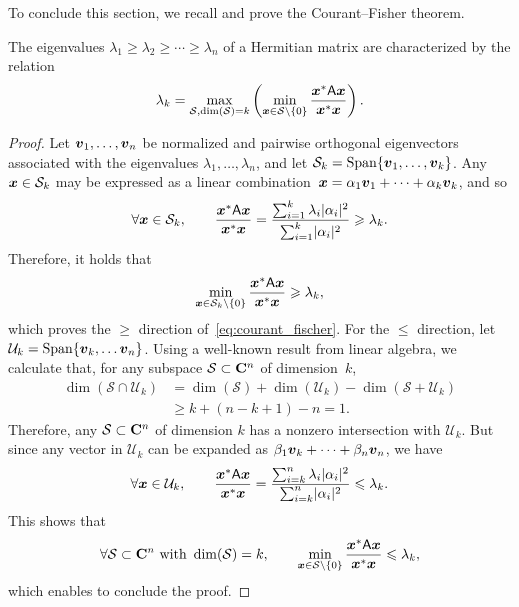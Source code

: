 To conclude this section,
we recall and prove the Courant--Fisher theorem.
\begin{theorem}
    \label{theorem:courant-fisher}
    The eigenvalues $\lambda_1 \geq \lambda_2 \geq \dotsb \geq \lambda_n$ of a Hermitian matrix are characterized by the relation
    \begin{equation}
        \label{eq:courant_fischer}
        \lambda_k = \max_{\mathcal S, {\rm dim}(\mathcal S) = k} \left( \min_{\mathbf{\boldsymbol{x}} \in \mathcal S \backslash\{0\}} \frac{\mathbf{\boldsymbol{x}}^* \mathsf A \mathbf{\boldsymbol{x}}}{\mathbf{\boldsymbol{x}}^* \mathbf{\boldsymbol{x}}} \right).
    \end{equation}
\end{theorem}
\begin{proof}
    Let $\mathbf{\boldsymbol{v}}_1, \dotsc, \mathbf{\boldsymbol{v}}_n$ be normalized and pairwise orthogonal eigenvectors associated with the eigenvalues $\lambda_1, \dotsc, \lambda_n$,
    and let $\mathcal S_k = \operatorname{Span} \{ \mathbf{\boldsymbol{v}}_1, \dotsc, \mathbf{\boldsymbol{v}}_k \}$.
    Any $\mathbf{\boldsymbol{x}} \in \mathcal S_k$ may be expressed as a linear combination~$\mathbf{\boldsymbol{x}} = \alpha_1 \mathbf{\boldsymbol{v}}_1 + \dotsb + \alpha_k \mathbf{\boldsymbol{v}}_k$,
    and so
    \[
        \forall \mathbf{\boldsymbol{x}} \in \mathcal S_k, \qquad
        \frac{\mathbf{\boldsymbol{x}}^* \mathsf A \mathbf{\boldsymbol{x}}}{\mathbf{\boldsymbol{x}}^* \mathbf{\boldsymbol{x}}} =
        \frac{\sum_{i=1}^{k} \lambda_i \lvert\alpha_i\rvert^2}{\sum_{i=1}^{k} \lvert\alpha_i\rvert^2}
        \geqslant \lambda_k.
    \]
    Therefore,
    it holds that
    \[
         \min_{\mathbf{\boldsymbol{x}} \in \mathcal S_k \backslash\{0\}} \frac{\mathbf{\boldsymbol{x}}^* \mathsf A \mathbf{\boldsymbol{x}}}{\mathbf{\boldsymbol{x}}^* \mathbf{\boldsymbol{x}}}  \geqslant \lambda_k,
    \]
    which proves the $\geq$ direction of~\eqref{eq:courant_fischer}.
    For the $\leq$ direction,
    let $\mathcal U_k = \operatorname{Span} \{ \mathbf{\boldsymbol{v}}_{k}, \dots \mathbf{\boldsymbol{v}}_n \}$.
    Using a well-known result from linear algebra,
    we calculate that, for any subspace $\mathcal S \subset \mathbf C^n$ of dimension~$k$,
    \begin{align*}
        \dim(\mathcal S \cap \mathcal U_k)
        &= \dim(\mathcal S) + \dim(\mathcal U_k) -\dim(\mathcal S + \mathcal U_k) \\
        &\geq  k + (n - k + 1) - n = 1.
    \end{align*}
    Therefore, any $\mathcal S \subset \mathbf C^n$ of dimension $k$
    has a nonzero intersection with $\mathcal U_k$.
    But since any vector in $\mathcal U_k$ can be expanded as $\beta_1 \mathbf{\boldsymbol{v}}_k + \dotsb + \beta_n \mathbf{\boldsymbol{v}}_n$,
    we have
    \[
        \forall \mathbf{\boldsymbol{x}} \in \mathcal U_k, \qquad
        \frac{\mathbf{\boldsymbol{x}}^* \mathsf A \mathbf{\boldsymbol{x}}}{\mathbf{\boldsymbol{x}}^* \mathbf{\boldsymbol{x}}} =
        \frac{\sum_{i=k}^{n} \lambda_i \lvert\alpha_i\rvert^2}{\sum_{i=k}^{n} \lvert\alpha_i\rvert^2}
        \leqslant \lambda_k.
    \]
    This shows that
    \[
        \forall \mathcal S \subset \mathbf C^n \text{ with } \dim(\mathcal S) = k,
        \qquad
         \min_{\mathbf{\boldsymbol{x}} \in \mathcal S \backslash\{0\}} \frac{\mathbf{\boldsymbol{x}}^* \mathsf A \mathbf{\boldsymbol{x}}}{\mathbf{\boldsymbol{x}}^* \mathbf{\boldsymbol{x}}}  \leqslant \lambda_k,
    \]
    which enables to conclude the proof.
\end{proof}

